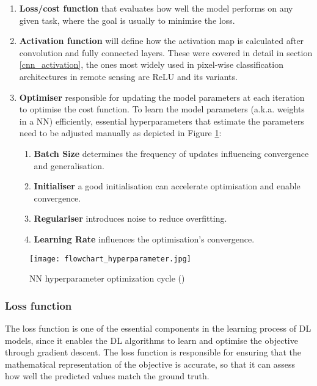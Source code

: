 \begin{enumerate}
    \item \textbf{Loss/cost function} that evaluates how well the model performs on any given task, where the goal is usually to minimise the loss.
    \item \textbf{Activation function} will define how the activation map is calculated after convolution and fully connected layers. These were covered in detail in section \ref{cnn_activation}, the ones most widely used in pixel-wise classification architectures in remote sensing are \gls{ReLU} and its variants.
    \item \textbf{Optimiser} responsible for updating the model parameters at each iteration to optimise the cost function. To learn the model parameters (\gls{a.k.a.} weights in a \gls{NN}) efficiently, essential hyperparameters that estimate the parameters need to be adjusted manually as depicted in Figure \ref{fig_hyperparameter}:
        \begin{enumerate}
            \item \textbf{Batch Size} determines the frequency of updates influencing convergence and generalisation.
            \item \textbf{Initialiser} a good initialisation can accelerate optimisation and enable convergence.
            \item \textbf{Regulariser} introduces noise to reduce overfitting.
            \item \textbf{Learning Rate} influences the optimisation’s convergence.
        \end{enumerate}
        
\end{enumerate}

    \begin{figure}[hbt!]
        \centering
        \texttt{[image: flowchart\_hyperparameter.jpg]}
        \caption{NN hyperparameter optimization cycle (\cite{hyperparameter_fig})}
        \label{fig_hyperparameter}
    \end{figure}
\subsubsection{Loss function} \label{loss_functions}
The loss function is one of the essential components in the learning process of \gls{DL} models, since it enables the \gls{DL} algorithms to learn and optimise the objective through gradient descent. The loss function is responsible for ensuring that the mathematical representation of the objective is accurate, so that it can assess how well the predicted values match the ground truth.

